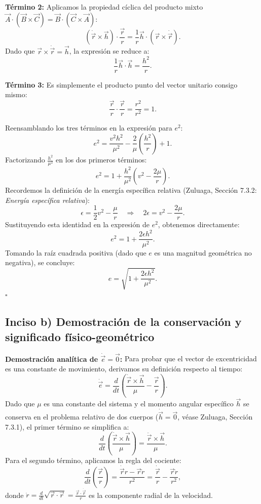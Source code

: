 \documentclass[12pt, a4paper]{article}
\begin{document}
\textbf{Término 2:} Aplicamos la propiedad cíclica del producto mixto $\vec{A} \cdot (\vec{B} \times \vec{C}) = \vec{B} \cdot (\vec{C} \times \vec{A})$:
$$
(\dot{\vec{r}} \times \vec{h}) \cdot \frac{\vec{r}}{r} = \frac{1}{r} \vec{h} \cdot (\vec{r} \times \dot{\vec{r}}).
$$
Dado que $\vec{r} \times \dot{\vec{r}} = \vec{h}$, la expresión se reduce a:
$$
\frac{1}{r} \vec{h} \cdot \vec{h} = \frac{h^2}{r}.
$$

\textbf{Término 3:} Es simplemente el producto punto del vector unitario consigo mismo:
$$
\frac{\vec{r}}{r} \cdot \frac{\vec{r}}{r} = \frac{r^2}{r^2} = 1.
$$

Reensamblando los tres términos en la expresión para $e^2$:
$$
e^2 = \frac{v^2 h^2}{\mu^2} - \frac{2}{\mu} \left( \frac{h^2}{r} \right) + 1.
$$
Factorizando $\frac{h^2}{\mu^2}$ en los dos primeros términos:
$$
e^2 = 1 + \frac{h^2}{\mu^2} \left( v^2 - \frac{2\mu}{r} \right).
$$
Recordemos la definición de la energía específica relativa (Zuluaga, Sección 7.3.2: \textit{Energía específica relativa}):
$$
\epsilon = \frac{1}{2} v^2 - \frac{\mu}{r} \quad \Longrightarrow \quad 2\epsilon = v^2 - \frac{2\mu}{r}.
$$
Sustituyendo esta identidad en la expresión de $e^2$, obtenemos directamente:
$$
e^2 = 1 + \frac{2\epsilon h^2}{\mu^2}.
$$
Tomando la raíz cuadrada positiva (dado que $e$ es una magnitud geométrica no negativa), se concluye:
$$
e = \sqrt{1 + \frac{2\epsilon h^2}{\mu^2}}.
$$
$\square$

\subsection*{Inciso b) Demostración de la conservación y significado físico-geométrico}

\textbf{Demostración analítica de $\dot{\vec{e}} = \vec{0}$:}
Para probar que el vector de excentricidad es una constante de movimiento, derivamos su definición respecto al tiempo:
$$
\dot{\vec{e}} = \frac{d}{dt} \left( \frac{\dot{\vec{r}} \times \vec{h}}{\mu} - \frac{\vec{r}}{r} \right).
$$
Dado que $\mu$ es una constante del sistema y el momento angular específico $\vec{h}$ se conserva en el problema relativo de dos cuerpos ($\dot{\vec{h}} = \vec{0}$, véase Zuluaga, Sección 7.3.1), el primer término se simplifica a:
$$
\frac{d}{dt} \left( \frac{\dot{\vec{r}} \times \vec{h}}{\mu} \right) = \frac{\ddot{\vec{r}} \times \vec{h}}{\mu}.
$$
Para el segundo término, aplicamos la regla del cociente:
$$
\frac{d}{dt} \left( \frac{\vec{r}}{r} \right) = \frac{\dot{\vec{r}} r - \vec{r} \dot{r}}{r^2} = \frac{\dot{\vec{r}}}{r} - \frac{\vec{r} \dot{r}}{r^2},
$$
donde $\dot{r} = \frac{d}{dt} \sqrt{\vec{r} \cdot \vec{r}} = \frac{\vec{r} \cdot \dot{\vec{r}}}{r}$ es la componente radial de la velocidad.
\end{document}
